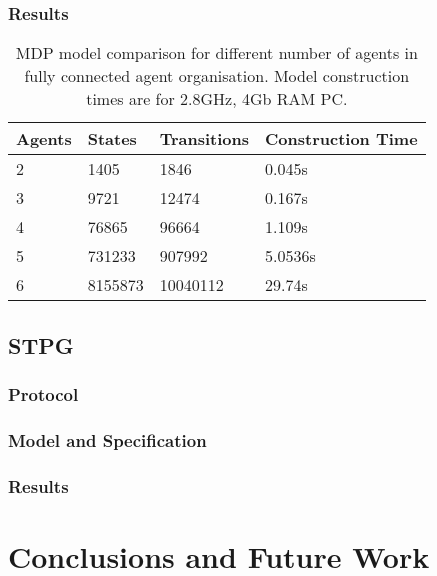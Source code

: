 \documentclass{llncs}
\begin{document}
\subsubsection{Results}
\begin{table}
 \centering
 \begin{tabular}{ | l | l | l | l |}
    \hline
    Agents & States & Transitions & Construction Time \\ \hline
    2 & 1405 & 1846 & 0.045s  \\ \hline
    3 & 9721 & 12474 & 0.167s \\ \hline
    4 & 76865 & 96664 & 1.109s \\ \hline
    5 & 731233 & 907992 & 5.0536s \\ \hline
    6 & 8155873 & 10040112 & 29.74s \\ \hline

\end{tabular}

\caption{MDP model comparison for different number of agents in fully connected agent organisation. Model construction times are for 2.8GHz, 4Gb RAM PC.}
\end{table}

\subsection{STPG}
\subsubsection{Protocol}
\subsubsection{Model and Specification}
\subsubsection{Results}

\section{Conclusions and Future Work}
\end{document}
